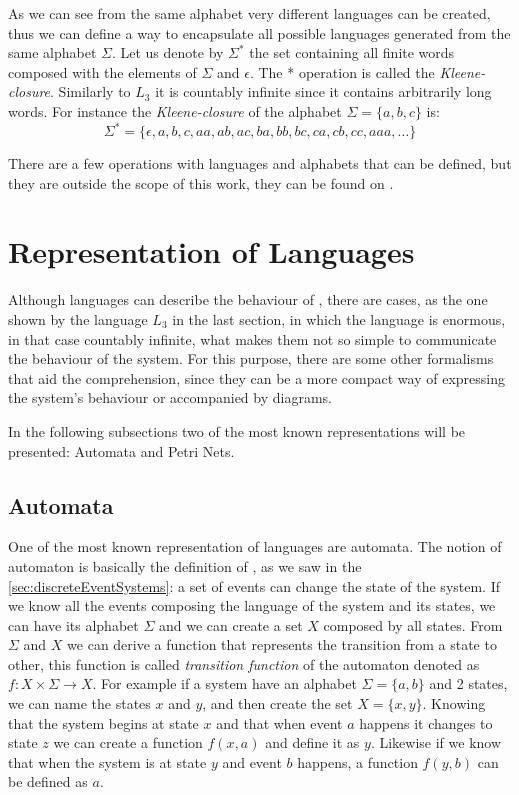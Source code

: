 As we can see from the same alphabet very different languages can be created,
thus we can define a way to encapsulate all possible languages generated from
the same alphabet $\Sigma$. Let us denote by $\Sigma^*$ the set containing all
finite words composed with the elements of $\Sigma$ and $\epsilon$. The *
operation is called the \textit{Kleene-closure}. Similarly to $L_3$ it is
countably infinite since it contains arbitrarily long words. For instance the
\textit{Kleene-closure} of the alphabet $\Sigma = \{a, b, c\}$ is:
\begin{equation*}
  \label{eq:kleeneExample}
  \Sigma^* = \{\epsilon,a,b,c,aa,ab,ac,ba,bb,bc,ca,cb,cc,aaa,\dots\} 
\end{equation*}

There are a few operations with languages and alphabets that can be defined, but
they are outside the scope of this work, they can be found on \cite{cassandras2009introduction}. 

\section{Representation of Languages}
\label{sec:representationLanguages}

Although languages can describe the behaviour of \DESs, there are cases, as the
one shown
by the language $L_3$ in the last section, in which the language is enormous, in
that case countably infinite, what makes them not so simple to communicate the
behaviour of the system. For this purpose, there are some other formalisms that
aid the comprehension, since they can be a more compact way of expressing the
system's behaviour or accompanied by diagrams.

In the following subsections two of the most known representations will be
presented: Automata and Petri Nets.

\pagebreak
\subsection{Automata}
\label{sec:automata}
One of the most known representation of languages are automata. The notion of
automaton is basically the definition of \DESs, as we saw in the
\autoref{sec:discreteEventSystems}: a set of events can change the state of the
system. If we know all the events composing the language of the
system and its states, we can have its alphabet $\Sigma$ and we can create a set $X$ composed
by all states.
From $\Sigma$ and $X$ we can derive a function that represents the transition
from a state to other, this function is called \emph{transition function} of the automaton
denoted as $f : X \times \Sigma \rightarrow X$. For example if a system have an
alphabet $\Sigma = \{a,b\}$ and 2 states, we can name the states $x$ and
$y$, and then create the set $X = \{x,y\}$. Knowing that the system begins at state $x$
and that when event $a$ happens it changes to state $z$ we can create a function
$f(x,a)$ and define it as $y$. Likewise if we know that when the system is at
state $y$ and event $b$ happens, a function $f(y,b)$ can be defined as $a$.

